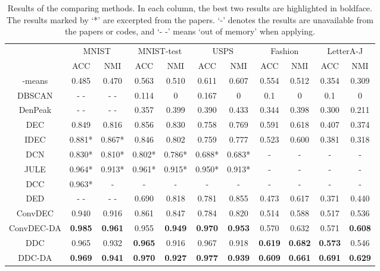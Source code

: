\documentclass[10pt,twocolumn,letterpaper]{article}
\begin{document}
\begin{table*}[!t]
  \centering
  \caption{Results of the comparing methods. In each column, the best two results are highlighted in boldface. The results marked by `*' are excerpted from the papers. `-' denotes the results are unavailable from the papers or codes, and `- -' means `out of memory' when applying.}
\begin{tabular}{c|cccccccccc}
    \hline
          & \multicolumn{2}{c}{MNIST} & \multicolumn{2}{c}{MNIST-test} & \multicolumn{2}{c}{USPS} & \multicolumn{2}{c}{Fashion} & \multicolumn{2}{c}{LetterA-J} \\
          & ACC   & NMI   & ACC   & NMI   & ACC   & NMI   & ACC   & NMI   & ACC   & NMI \\
    \hline
    -means & 0.485  & 0.470  & 0.563  & 0.510  & 0.611  & 0.607  & 0.554  & 0.512  & 0.354  & 0.309  \\
    DBSCAN & - -     & - -     & 0.114  & 0     & 0.167  & 0     & 0.1   & 0     & 0.1   & 0 \\
    DenPeak & - -     & - -     & 0.357  & 0.399  & 0.390  & 0.433  & 0.344  & 0.398  & 0.300  & 0.211  \\
    DEC   & 0.849  & 0.816  & 0.856  & 0.830  & 0.758  & 0.769  & 0.591  & 0.618  & 0.407  & 0.374  \\
    IDEC  & 0.881* & 0.867* & 0.846  & 0.802  & 0.759  & 0.777  & 0.523  & 0.600  & {0.381 } & {0.318 } \\
    DCN   & 0.830* & 0.810* & 0.802* & 0.786* & 0.688* & 0.683* & -     & -     & -     & - \\
    JULE  & 0.964* & 0.913* & 0.961* & 0.915* & 0.950* & 0.913* & -     & -     & -     & - \\
    DCC   & 0.963*  & -     & -     & -     & -     & -     & -     & -     & -     & - \\
    DED   & - -     & - -     & 0.690  & 0.818  & 0.781  & 0.855  & 0.473  & 0.617  & 0.371  & 0.440  \\
    ConvDEC & 0.940  & 0.916  & 0.861  & 0.847  & 0.784  & 0.820  & 0.514  & 0.588  & 0.517  & 0.536  \\
    ConvDEC-DA & \textbf{0.985 } & \textbf{0.961 } & {0.955 } & {\textbf{0.949 }} & {\textbf{0.970 }} & {\textbf{0.953 }} & 0.570  & 0.632  & 0.571  & \textbf{0.608}  \\
    DDC & {0.965 } &{0.932 } & \textbf{0.965 } & 0.916  & 0.967  & 0.918  & \textbf{0.619 } & \textbf{0.682 } & \textbf{0.573 } & {0.546 } \\
    DDC-DA & {\textbf{0.969 }} & {\textbf{0.941 }} & \textbf{0.970 } & \textbf{0.927 } & \textbf{0.977 } & \textbf{0.939 } & \textbf{0.609 } & \textbf{0.661 } & \textbf{0.691 } & \textbf{0.629 } \\
    \hline
    \end{tabular}\label{tab:results}\end{table*}
\end{document}
